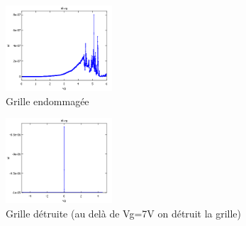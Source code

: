  \begin{figure}[h]
    \begin{center}
        \includegraphics[width=150px]{Images/Grille_Endommagee}
        \caption{Grille endommagée}
        \label{fig:}
    \end{center}
\end{figure}

 \begin{figure}[h]
    \begin{center}
        \includegraphics[width=150px]{Images/Grille_Detruite}
        \caption{Grille détruite (au delà de Vg=7V on détruit la grille)}
        \label{fig:}
    \end{center}
\end{figure}




